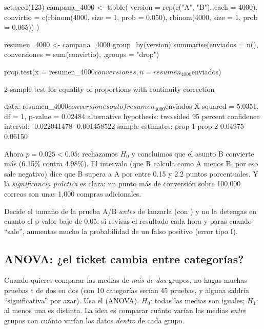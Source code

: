 \begin{rcode}
set.seed(123)
campana_4000 <- tibble(
  version   = rep(c("A", "B"), each = 4000),
  convirtio = c(rbinom(4000, size = 1, prob = 0.050),
                rbinom(4000, size = 1, prob = 0.065))
)

resumen_4000 <- campana_4000 %
  group_by(version) %
  summarise(enviados = n(), conversiones = sum(convirtio),
            .groups = "drop")

prop.test(x = resumen_4000$conversiones, n = resumen_4000$enviados)
\end{rcode}
\begin{rsalida}
        2-sample test for equality of proportions with continuity
        correction

data:  resumen_4000$conversiones out of resumen_4000$enviados
X-squared = 5.0351, df = 1, p-value = 0.02484
alternative hypothesis: two.sided
95 percent confidence interval:
 -0.022041478 -0.001458522
sample estimates:
 prop 1  prop 2
0.04975 0.06150
\end{rsalida}

Ahora $p = 0.025 < 0.05$: rechazamos $H_0$ y concluimos que el asunto B
convierte más (6.15\% contra 4.98\%). El intervalo (que R calcula como A menos B,
por eso sale negativo) dice que B supera a A por entre 0.15 y 2.2 puntos
porcentuales. Y la \emph{significancia práctica} es
clara: un punto más de conversión sobre 100,000 correos son unas 1,000
compras adicionales.

\begin{consejo}
Decide el tamaño de la prueba A/B \emph{antes} de lanzarla (con
) y no la detengas en cuanto el p-valor baje de
0.05: si revisas el resultado cada hora y paras cuando ``sale'', aumentas
mucho la probabilidad de un falso positivo (error tipo I).
\end{consejo}

\subsection{ANOVA: ¿el ticket cambia entre categorías?}

Cuando quieres comparar las medias de \emph{más de dos} grupos, no hagas
muchas pruebas t de dos en dos (con 10 categorías serían 45 pruebas, y
alguna saldría ``significativa'' por azar). Usa el  (ANOVA). $H_0$: todas las medias son iguales; $H_1$: al menos una
es distinta. La idea es comparar cuánto varían las medias \emph{entre}
grupos con cuánto varían los datos \emph{dentro} de cada grupo.

